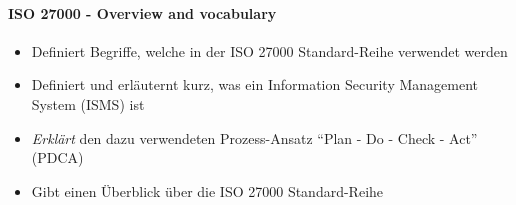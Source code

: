 \documentclass[10pt,a4paper]{article}
\begin{document}
\paragraph*{ISO 27000 - Overview and vocabulary}\label{para:ISO 27000}
\begin{itemize}[noitemsep,topsep=0pt,leftmargin=*]
    \item Definiert Begriffe, welche in der ISO 27000 Standard-Reihe verwendet werden
    \item Definiert und erläuternt kurz, was ein Information Security Management System (ISMS) ist
    \item \textsl{Erklärt} den dazu verwendeten Prozess-Ansatz "`Plan - Do - Check - Act"' (PDCA)
    \item Gibt einen Überblick über die ISO 27000 Standard-Reihe
\end{itemize}
\end{document}
